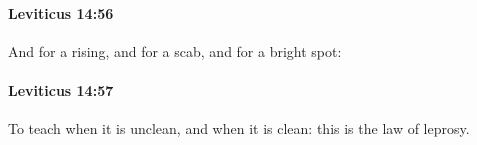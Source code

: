 		\paragraph{Leviticus 14:56} %
			\label{LEVITICUS-14-56}

			And for a rising, and for a scab, and for a bright spot:


		\paragraph{Leviticus 14:57} %
			\label{LEVITICUS-14-57}

			To teach when it is unclean, and when it is clean: this is the law of leprosy.

